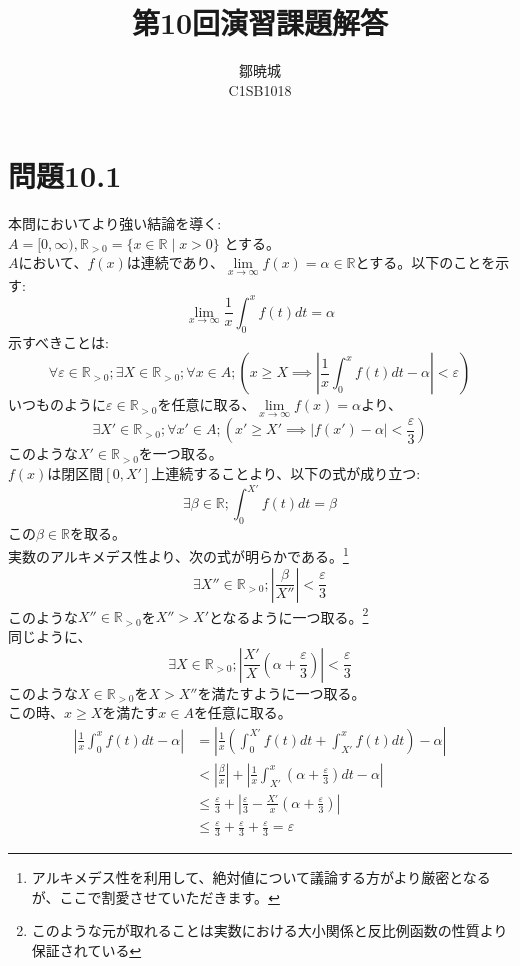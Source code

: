 \documentclass{jreport}
\begin{document}
\title{第10回演習課題解答}
\author{鄒暁城\\ C1SB1018}
\maketitle
\newpage
\tableofcontents
\newpage
\setcounter{chapter}{10}
\section{問題10.1}
\noindent 本問においてより強い結論を導く:\\
$A=[0,\infty ),\mathbb{R}_{>0} = \{x \in \mathbb{R} \mid x>0 \}$ とする。\\
$A$において、$f(x)$は連続であり、$\lim\limits_{x \to \infty} f(x) = \alpha \in \mathbb{R}$とする。以下のことを示す:
$$
\lim_{x \to \infty} \frac{1}{x} \int_0^x f(t)dt = \alpha
$$
示すべきことは:
$$
\forall \varepsilon \in \mathbb{R}_{>0} ;\exists X \in \mathbb{R}_{>0} ; \forall x \in A; \left( x \ge X \implies \left| \frac{1}{x} \int_0^x f(t) dt  - \alpha \right| < \varepsilon \right)
$$
いつものように$\varepsilon \in \mathbb{R}_{>0}$を任意に取る、$\lim\limits_{x \to \infty} f(x) = \alpha$より、
$$
\exists X' \in \mathbb{R}_{>0};\forall x' \in A ; \left( x' \ge X' \implies \left| f(x') - \alpha \right| < \frac{\varepsilon}{3 } \right)
$$
このような$X' \in \mathbb{R}_{>0} $を一つ取る。\\
$f(x)$は閉区間$[0,X']$上連続することより、以下の式が成り立つ:
$$
\exists \beta \in \mathbb{R}; \int_0^{X'} f(t)dt =\beta
$$
この$\beta \in \mathbb{R}$を取る。\\
実数のアルキメデス性より、次の式が明らかである。\footnote{アルキメデス性を利用して、絶対値について議論する方がより厳密となるが、ここで割愛させていただきます。} 
$$
\exists X'' \in \mathbb{R}_{>0}; \left| \frac{\beta}{X''} \right| < \frac{\varepsilon}{3}
$$
このような$X'' \in \mathbb{R}_{>0}$を$X''> X'$となるように一つ取る。\footnote{このような元が取れることは実数における大小関係と反比例函数の性質より保証されている}\\
同じように、
$$
\exists X \in \mathbb{R}_{>0}; \left|  \frac{X'}{X} \left( \alpha + \frac{\varepsilon}{3} \right) \right| < \frac{\varepsilon}{3}
$$
このような$X \in \mathbb{R}_{>0}$を$X>X''$を満たすように一つ取る。\\
この時、$x \ge X$を満たす$x \in A$を任意に取る。\\
\begin{equation}
	\begin{aligned}
		\left| \frac{1}{x} \int_0^x f(t) dt -\alpha \right| & = \left| \frac{1}{x} \left( \int_0^{X'}  f(t) dt + \int_{X'}^x f(t) dt \right) -\alpha \right| \\
		&< \left| \frac{\beta}{x} \right| + \left| \frac{1}{x} \int_{X'}^x \left( \alpha +\frac{\varepsilon}{3} \right) dt - \alpha \right|\\
		&\le \frac{\varepsilon}{3} + \left| \frac{\varepsilon}{3} - \frac{X'}{x} \left( \alpha + \frac{\varepsilon}{3} \right) \right| \\
		&\le \frac{\varepsilon}{3} + \frac{\varepsilon}{3} + \frac{\varepsilon}{3} =\varepsilon
	\end{aligned}
\end{equation}
\end{document}
